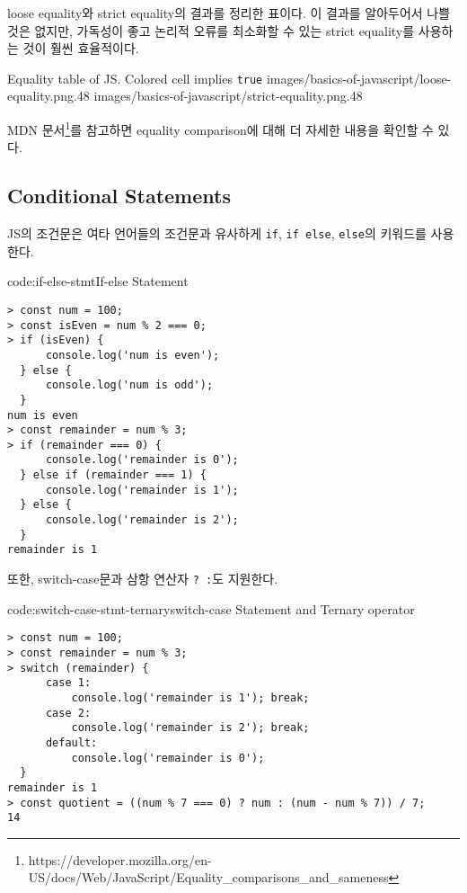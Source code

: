 \은 loose equality와 strict equality의 결과를 정리한 표이다. 이 결과를 알아두어서 나쁠 것은 없지만, 가독성이 좋고 논리적 오류를 최소화할 수 있는 strict equality를 사용하는 것이 훨씬 효율적이다.

    {Equality table of JS. Colored cell implies \texttt{true}\protect\footnotemark}{
        {images/basics-of-javascript/loose-equality.png}{.48}
        {images/basics-of-javascript/strict-equality.png}{.48}
}


MDN 문서\footnote{https://developer.mozilla.org/en-US/docs/Web/JavaScript/Equality\_comparisons\_and\_sameness}를 참고하면 equality comparison에 대해 더 자세한 내용을 확인할 수 있다.

\subsection*{Conditional Statements}

JS의 조건문은 여타 언어들의 조건문과 유사하게 \texttt{if}, \texttt{if else}, \texttt{else}의 키워드를 사용한다.

\begin{codeenv}{code:if-else-stmt}{If-else Statement}\begin{verbatim}
> const num = 100;
> const isEven = num % 2 === 0;
> if (isEven) {
      console.log('num is even');
  } else {
      console.log('num is odd');
  }
num is even
> const remainder = num % 3;
> if (remainder === 0) {
      console.log('remainder is 0');
  } else if (remainder === 1) {
      console.log('remainder is 1');
  } else {
      console.log('remainder is 2');
  }
remainder is 1
\end{verbatim}
\end{codeenv}
\newpage

또한, switch-case문과 삼항 연산자 \texttt{? :}도 지원한다.

\begin{codeenv}{code:switch-case-stmt-ternary}{switch-case Statement and Ternary operator}\begin{verbatim}
> const num = 100;
> const remainder = num % 3;
> switch (remainder) {
      case 1:
          console.log('remainder is 1'); break;
      case 2:
          console.log('remainder is 2'); break;
      default:
          console.log('remainder is 0');
  }
remainder is 1
> const quotient = ((num % 7 === 0) ? num : (num - num % 7)) / 7;
14
\end{verbatim}
\end{codeenv}

